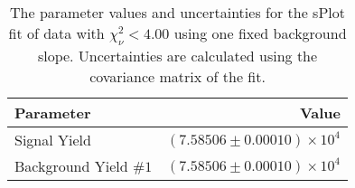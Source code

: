 
\begin{table}[h]
    \begin{center}
        \begin{tabular}{lr}\toprule
            Parameter & Value \\\midrule
            Signal Yield & $(7.58506 \pm 0.00010) \times 10^{4}$ \\
            Background Yield $\#1$ & $(7.58506 \pm 0.00010) \times 10^{4}$ \\\bottomrule
        \end{tabular}
        \caption{The parameter values and uncertainties for the sPlot fit of data with $\chi^2_\nu < 4.00$ using one fixed background slope. Uncertainties are calculated using the covariance matrix of the fit.}
    \end{center}
\end{table}

